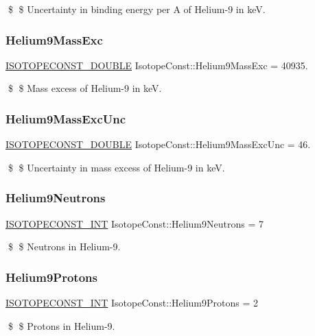 \$ \$ Uncertainty in binding energy per A of Helium-\/9 in keV. \mbox{\label{group___isotope_const-_helium-_he9_ga22a71e282e5b7140585fbf88d10b64b7}} 
\subsubsection{\texorpdfstring{Helium9\+Mass\+Exc}{Helium9MassExc}}
{\footnotesize\ttfamily \mbox{\hyperlink{group___isotope_const-_macros_ga8f45a7272ce02c0b4c65c44636ed719a}{I\+S\+O\+T\+O\+P\+E\+C\+O\+N\+S\+T\+\_\+\+D\+O\+U\+B\+LE}} Isotope\+Const\+::\+Helium9\+Mass\+Exc = 40935.}

\$ \$ Mass excess of Helium-\/9 in keV. \mbox{\label{group___isotope_const-_helium-_he9_ga41341d24e74cf4cfd9d870eabb0935f3}} 
\subsubsection{\texorpdfstring{Helium9\+Mass\+Exc\+Unc}{Helium9MassExcUnc}}
{\footnotesize\ttfamily \mbox{\hyperlink{group___isotope_const-_macros_ga8f45a7272ce02c0b4c65c44636ed719a}{I\+S\+O\+T\+O\+P\+E\+C\+O\+N\+S\+T\+\_\+\+D\+O\+U\+B\+LE}} Isotope\+Const\+::\+Helium9\+Mass\+Exc\+Unc = 46.}

\$ \$ Uncertainty in mass excess of Helium-\/9 in keV. \mbox{\label{group___isotope_const-_helium-_he9_gaf1a0855e01916583ba06edc48597557f}} 
\subsubsection{\texorpdfstring{Helium9\+Neutrons}{Helium9Neutrons}}
{\footnotesize\ttfamily \mbox{\hyperlink{group___isotope_const-_macros_ga5f18360b3e99483a35c32d789e62621c}{I\+S\+O\+T\+O\+P\+E\+C\+O\+N\+S\+T\+\_\+\+I\+NT}} Isotope\+Const\+::\+Helium9\+Neutrons = 7}

\$ \$ Neutrons in Helium-\/9. \mbox{\label{group___isotope_const-_helium-_he9_ga243a15e5fe696f45073827dbe43d85a4}} 
\subsubsection{\texorpdfstring{Helium9\+Protons}{Helium9Protons}}
{\footnotesize\ttfamily \mbox{\hyperlink{group___isotope_const-_macros_ga5f18360b3e99483a35c32d789e62621c}{I\+S\+O\+T\+O\+P\+E\+C\+O\+N\+S\+T\+\_\+\+I\+NT}} Isotope\+Const\+::\+Helium9\+Protons = 2}

\$ \$ Protons in Helium-\/9. 